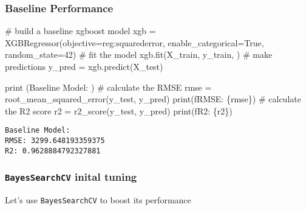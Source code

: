 \documentclass[
  letterpaper,
  DIV=11,
  numbers=noendperiod]{scrreprt}
\newenvironment{Shaded}{\begin{snugshade}}{\end{snugshade}}
\newcommand{\BuiltInTok}[1]{\textcolor[rgb]{0.00,0.23,0.31}{#1}}
\newcommand{\CommentTok}[1]{\textcolor[rgb]{0.37,0.37,0.37}{#1}}
\newcommand{\DecValTok}[1]{\textcolor[rgb]{0.68,0.00,0.00}{#1}}
\newcommand{\NormalTok}[1]{\textcolor[rgb]{0.00,0.23,0.31}{#1}}
\newcommand{\OperatorTok}[1]{\textcolor[rgb]{0.37,0.37,0.37}{#1}}
\newcommand{\SpecialCharTok}[1]{\textcolor[rgb]{0.37,0.37,0.37}{#1}}
\newcommand{\SpecialStringTok}[1]{\textcolor[rgb]{0.13,0.47,0.30}{#1}}
\newcommand{\StringTok}[1]{\textcolor[rgb]{0.13,0.47,0.30}{#1}}
\newcommand{\VariableTok}[1]{\textcolor[rgb]{0.07,0.07,0.07}{#1}}
\begin{document}
\subsubsection{Baseline Performance}\label{baseline-performance}

\begin{Shaded}
\begin{Highlighting}[]
\CommentTok{\# build a baseline xgboost model}
\NormalTok{xgb }\OperatorTok{=}\NormalTok{ XGBRegressor(objective}\OperatorTok{=}\StringTok{\textquotesingle{}reg:squarederror\textquotesingle{}}\NormalTok{, enable\_categorical}\OperatorTok{=}\VariableTok{True}\NormalTok{, random\_state}\OperatorTok{=}\DecValTok{42}\NormalTok{)}
\CommentTok{\# fit the model}
\NormalTok{xgb.fit(X\_train, y\_train, )}
\CommentTok{\# make predictions}
\NormalTok{y\_pred }\OperatorTok{=}\NormalTok{ xgb.predict(X\_test)}

\BuiltInTok{print}\NormalTok{ (}\StringTok{\textquotesingle{}Baseline Model: \textquotesingle{}}\NormalTok{)}
\CommentTok{\# calculate the RMSE}
\NormalTok{rmse }\OperatorTok{=}\NormalTok{ root\_mean\_squared\_error(y\_test, y\_pred)}
\BuiltInTok{print}\NormalTok{(}\SpecialStringTok{f\textquotesingle{}RMSE: }\SpecialCharTok{\{}\NormalTok{rmse}\SpecialCharTok{\}}\SpecialStringTok{\textquotesingle{}}\NormalTok{)}
\CommentTok{\# calculate the R2 score}
\NormalTok{r2 }\OperatorTok{=}\NormalTok{ r2\_score(y\_test, y\_pred)}
\BuiltInTok{print}\NormalTok{(}\SpecialStringTok{f\textquotesingle{}R2: }\SpecialCharTok{\{}\NormalTok{r2}\SpecialCharTok{\}}\SpecialStringTok{\textquotesingle{}}\NormalTok{)}
\end{Highlighting}
\end{Shaded}

\begin{verbatim}
Baseline Model: 
RMSE: 3299.648193359375
R2: 0.9628884792327881
\end{verbatim}

\subsubsection{\texorpdfstring{\texttt{BayesSearchCV} inital
tuning}{BayesSearchCV inital tuning}}\label{bayessearchcv-inital-tuning}

Let's use \texttt{BayesSearchCV} to boost its performance
\end{document}
